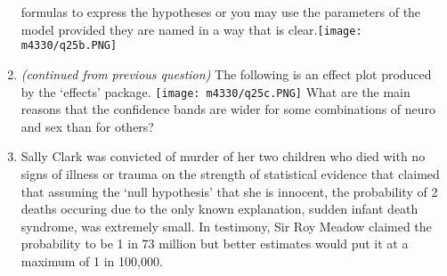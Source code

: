 \documentclass[
]{article}
\begin{document}
\begin{enumerate}
  formulas to express the hypotheses or you may use the parameters of
  the model provided they are named in a way that is
  clear.\newline \texttt{[image: m4330/q25b.PNG]} \newline \vspace{0px}
\item
  \emph{(continued from previous question)} The following is an effect
  plot produced by the `effects' package.
  \newline \texttt{[image: m4330/q25c.PNG]} \newline  What are the main
  reasons that the confidence bands are wider for some combinations of
  neuro and sex than for others? \vspace{0px}
\item
  Sally Clark was convicted of murder of her two children who died with
  no signs of illness or trauma on the strength of statistical evidence
  that claimed that assuming the `null hypothesis' that she is innocent,
  the probability of 2 deaths occuring due to the only known
  explanation, sudden infant death syndrome, was extremely small. In
  testimony, Sir Roy Meadow claimed the probability to be 1 in 73
  million but better estimates would put it at a maximum of 1 in
  100,000.

  \par


\end{enumerate}
\end{document}
